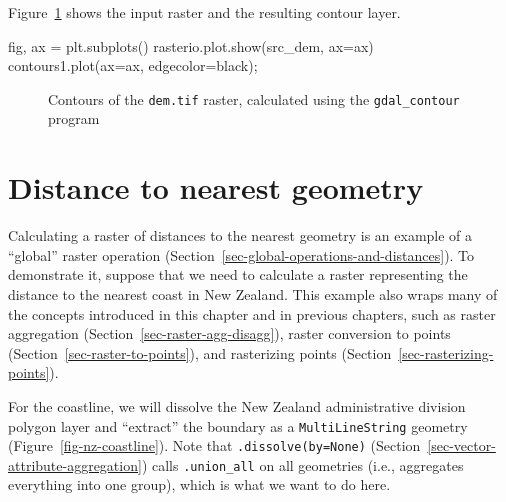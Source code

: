\documentclass[
  letterpaper,
]{krantz}
\newenvironment{Shaded}{\begin{snugshade}}{\end{snugshade}}
\newcommand{\NormalTok}[1]{\textcolor[rgb]{0.00,0.23,0.31}{#1}}
\newcommand{\OperatorTok}[1]{\textcolor[rgb]{0.37,0.37,0.37}{#1}}
\newcommand{\StringTok}[1]{\textcolor[rgb]{0.13,0.47,0.30}{#1}}
\begin{document}
Figure~\ref{fig-raster-contours2} shows the input raster and the
resulting contour layer.

\begin{Shaded}
\begin{Highlighting}[]
\NormalTok{fig, ax }\OperatorTok{=}\NormalTok{ plt.subplots()}
\NormalTok{rasterio.plot.show(src\_dem, ax}\OperatorTok{=}\NormalTok{ax)}
\NormalTok{contours1.plot(ax}\OperatorTok{=}\NormalTok{ax, edgecolor}\OperatorTok{=}\StringTok{\textquotesingle{}black\textquotesingle{}}\NormalTok{)}\OperatorTok{;}
\end{Highlighting}
\end{Shaded}

\begin{figure}[H]


\caption{\label{fig-raster-contours2}Contours of the \texttt{dem.tif}
raster, calculated using the \texttt{gdal\_contour} program}

\end{figure}%

\section{Distance to nearest
geometry}\label{sec-distance-to-nearest-geometry}

Calculating a raster of distances to the nearest geometry is an example
of a ``global'' raster operation
(Section~\ref{sec-global-operations-and-distances}). To demonstrate it,
suppose that we need to calculate a raster representing the distance to
the nearest coast in New Zealand. This example also wraps many of the
concepts introduced in this chapter and in previous chapters, such as
raster aggregation (Section~\ref{sec-raster-agg-disagg}), raster
conversion to points (Section~\ref{sec-raster-to-points}), and
rasterizing points (Section~\ref{sec-rasterizing-points}).

For the coastline, we will dissolve the New Zealand administrative
division polygon layer and ``extract'' the boundary as a
\texttt{\textquotesingle{}MultiLineString\textquotesingle{}} geometry
(Figure~\ref{fig-nz-coastline}). Note that \texttt{.dissolve(by=None)}
(Section~\ref{sec-vector-attribute-aggregation}) calls
\texttt{.union\_all} on all geometries (i.e., aggregates everything into
one group), which is what we want to do here.
\end{document}
